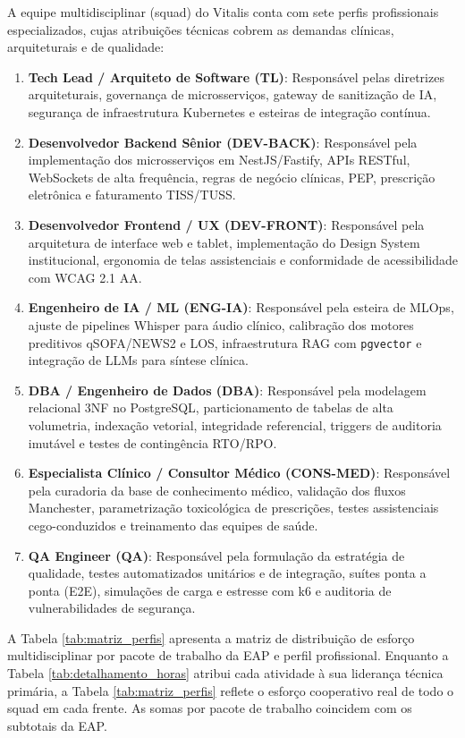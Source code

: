 A equipe multidisciplinar (squad) do Vitalis conta com sete perfis profissionais especializados, cujas atribuições técnicas cobrem as demandas clínicas, arquiteturais e de qualidade:
\begin{enumerate}[leftmargin=*]
    \item \textbf{Tech Lead / Arquiteto de Software (TL)}: Responsável pelas diretrizes arquiteturais, governança de microsserviços, gateway de sanitização de IA, segurança de infraestrutura Kubernetes e esteiras de integração contínua.
    \item \textbf{Desenvolvedor Backend Sênior (DEV-BACK)}: Responsável pela implementação dos microsserviços em NestJS/Fastify, APIs RESTful, WebSockets de alta frequência, regras de negócio clínicas, PEP, prescrição eletrônica e faturamento TISS/TUSS.
    \item \textbf{Desenvolvedor Frontend / UX (DEV-FRONT)}: Responsável pela arquitetura de interface web e tablet, implementação do Design System institucional, ergonomia de telas assistenciais e conformidade de acessibilidade com WCAG 2.1 AA.
    \item \textbf{Engenheiro de IA / ML (ENG-IA)}: Responsável pela esteira de MLOps, ajuste de pipelines Whisper para áudio clínico, calibração dos motores preditivos qSOFA/NEWS2 e LOS, infraestrutura RAG com \texttt{pgvector} e integração de LLMs para síntese clínica.
    \item \textbf{DBA / Engenheiro de Dados (DBA)}: Responsável pela modelagem relacional 3NF no PostgreSQL, particionamento de tabelas de alta volumetria, indexação vetorial, integridade referencial, triggers de auditoria imutável e testes de contingência RTO/RPO.
    \item \textbf{Especialista Clínico / Consultor Médico (CONS-MED)}: Responsável pela curadoria da base de conhecimento médico, validação dos fluxos Manchester, parametrização toxicológica de prescrições, testes assistenciais cego-conduzidos e treinamento das equipes de saúde.
    \item \textbf{QA Engineer (QA)}: Responsável pela formulação da estratégia de qualidade, testes automatizados unitários e de integração, suítes ponta a ponta (E2E), simulações de carga e estresse com k6 e auditoria de vulnerabilidades de segurança.
\end{enumerate}

A Tabela \ref{tab:matriz_perfis} apresenta a matriz de distribuição de esforço multidisciplinar por pacote de trabalho da EAP e perfil profissional. Enquanto a Tabela \ref{tab:detalhamento_horas} atribui cada atividade à sua liderança técnica primária, a Tabela \ref{tab:matriz_perfis} reflete o esforço cooperativo real de todo o squad em cada frente. As somas por pacote de trabalho coincidem com os subtotais da EAP.

